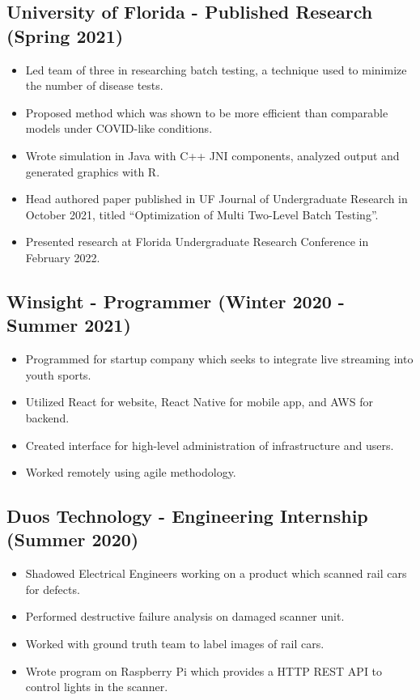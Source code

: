 \documentclass{article}
\newenvironment{CustomItemize}
{ \begin{itemize}[leftmargin=1em]
    \setlength{\itemsep}{0pt}
    \setlength{\parskip}{0pt}
    \setlength{\parindent}{0pt}
    \setlength{\parsep}{0pt}     }
{ \end{itemize}                  }
\begin{document}
\subsection{University of Florida - Published Research (Spring 2021)}
\begin{CustomItemize}
\item Led team of three in researching batch testing, a technique used to minimize the number of disease tests.
\item Proposed method which was shown to be more efficient than comparable models under COVID-like conditions.
\item Wrote simulation in Java with C++ JNI components, analyzed output and generated graphics with R.
\item Head authored paper published in UF Journal of Undergraduate Research in October 2021, titled ``Optimization of Multi Two-Level Batch Testing''.
\item Presented research at Florida Undergraduate Research Conference in February 2022.
\end{CustomItemize}

\subsection{Winsight - Programmer (Winter 2020 - Summer 2021)}
\begin{CustomItemize}
\item Programmed for startup company which seeks to integrate live streaming into youth sports.
\item Utilized React for website, React Native for mobile app, and AWS for backend.
\item Created interface for high-level administration of infrastructure and users.
\item Worked remotely using agile methodology.
\end{CustomItemize}

\subsection{Duos Technology - Engineering Internship (Summer 2020)}
\begin{CustomItemize}
\item Shadowed Electrical Engineers working on a product which scanned rail cars for defects.
\item Performed destructive failure analysis on damaged scanner unit.
\item Worked with ground truth team to label images of rail cars.
\item Wrote program on Raspberry Pi which provides a HTTP REST API to control lights in the scanner.
\end{CustomItemize}
\end{document}

